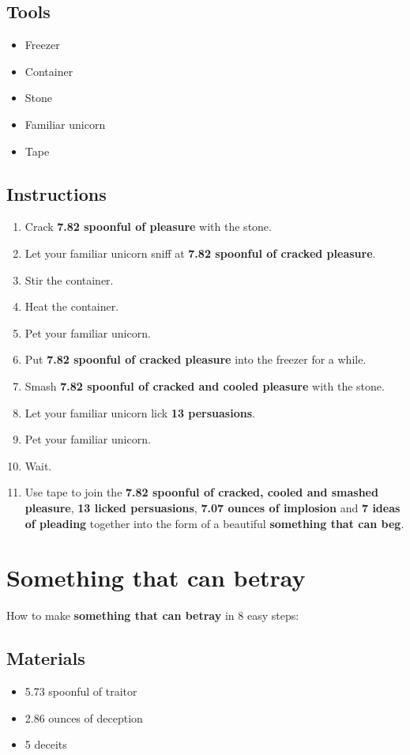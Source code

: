 \documentclass{article}
\begin{document}
\subsection{Tools}\begin{itemize}
\item 
Freezer
\item 
Container
\item 
Stone
\item 
Familiar unicorn
\item 
Tape
\end{itemize}
\subsection{Instructions}\begin{enumerate}
\item 
Crack \textbf{7.82 spoonful of pleasure} with the stone.
\item 
Let your familiar unicorn sniff at \textbf{7.82 spoonful of cracked pleasure}.
\item 
Stir the container.
\item 
Heat the container.
\item 
Pet your familiar unicorn.
\item 
Put \textbf{7.82 spoonful of cracked pleasure} into the freezer for a while.
\item 
Smash \textbf{7.82 spoonful of cracked and cooled pleasure} with the stone.
\item 
Let your familiar unicorn lick \textbf{13 persuasions}.
\item 
Pet your familiar unicorn.
\item 
Wait.
\item 
Use tape to join the \textbf{7.82 spoonful of cracked, cooled and smashed pleasure}, \textbf{13 licked persuasions}, \textbf{7.07 ounces of implosion} and \textbf{7 ideas of pleading} together into the form of a beautiful \textbf{something that can beg}.
\end{enumerate}
\newpage
\section{Something that can betray}How to make \textbf{something that can betray} in 8 easy steps:

\subsection{Materials}\begin{itemize}
\item 
5.73 spoonful of traitor
\item 
2.86 ounces of deception
\item 
5 deceits
\end{itemize}
\end{document}
